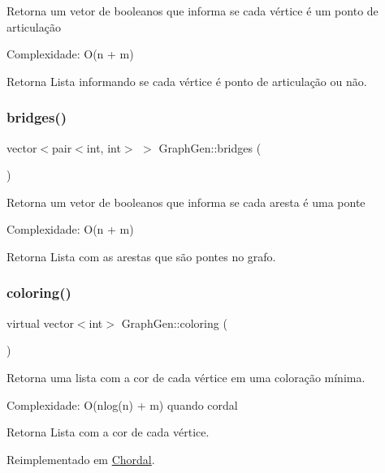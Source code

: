 Retorna um vetor de booleanos que informa se cada vértice é um ponto de articulação

Complexidade\+: O(n + m) \begin{DoxyReturn}{Retorna}
Lista informando se cada vértice é ponto de articulação ou não. 
\end{DoxyReturn}
\mbox{\label{classGraphGen_ac80b65f7234db5bc163c7736aa0f561a}} 
\subsubsection{\texorpdfstring{bridges()}{bridges()}}
{\footnotesize\ttfamily vector$<$pair$<$int, int$>$ $>$ Graph\+Gen\+::bridges (\begin{DoxyParamCaption}{ }\end{DoxyParamCaption})}

Retorna um vetor de booleanos que informa se cada aresta é uma ponte

Complexidade\+: O(n + m) \begin{DoxyReturn}{Retorna}
Lista com as arestas que são pontes no grafo. 
\end{DoxyReturn}
\mbox{\label{classGraphGen_ad44c80646f694460fafa3e3657beb4d0}} 
\subsubsection{\texorpdfstring{coloring()}{coloring()}}
{\footnotesize\ttfamily virtual vector$<$int$>$ Graph\+Gen\+::coloring (\begin{DoxyParamCaption}{ }\end{DoxyParamCaption})\hspace{0.3cm}{\ttfamily [virtual]}}

Retorna uma lista com a cor de cada vértice em uma coloração mínima.

Complexidade\+: O(nlog(n) + m) quando cordal \begin{DoxyReturn}{Retorna}
Lista com a cor de cada vértice. 
\end{DoxyReturn}


Reimplementado em \mbox{\hyperlink{classChordal_acac4822a1eb3376c29f3d193baaec91f}{Chordal}}.

\mbox{\label{classGraphGen_a36741424a266249c915f29fbab96175c}} 
